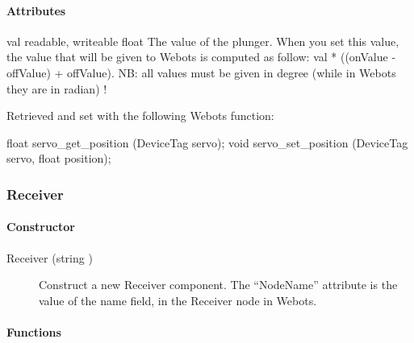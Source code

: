 \paragraph{Attributes}

\begin{itemize}
\begin{attribute}{val}
  {readable, writeable}
  {float}
  {}
  The value of the plunger. When you set this value, the
  value that will be given to Webots is computed as follow: val *
  ((onValue -{} offValue) + offValue).  NB: all values must be given in
  degree (while in Webots they are in radian) !

  Retrieved and set with the following Webots function:
\begin{cxx}
float servo_get_position  (DeviceTag servo);
void servo_set_position  (DeviceTag servo, float position);
\end{cxx}
\end{attribute}
\end{itemize}

\subsubsection{Receiver}

\paragraph{Constructor}

\begin{description}
\item[{Receiver (string )}] Construct a new Receiver
  component. The ``NodeName'' attribute is the value of the name
  field, in the Receiver node in Webots.
\end{description}

\paragraph{Functions}

